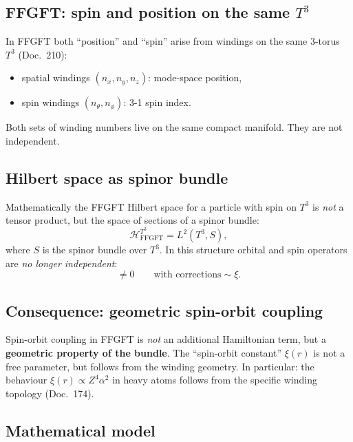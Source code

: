 \subsection{FFGFT: spin and position on the same $T^3$}

In FFGFT both \enquote{position} and \enquote{spin} arise from
windings on the same 3-torus $T^3$ (Doc.~210):
\begin{itemize}[leftmargin=2em,itemsep=2pt,topsep=2pt]
  \item spatial windings $(n_x, n_y, n_z)$: mode-space position,
  \item spin windings $(n_\theta, n_\phi)$: 3-1 spin index.
\end{itemize}
Both sets of winding numbers live on the same compact manifold.
They are not independent.

\subsection{Hilbert space as spinor bundle}

Mathematically the FFGFT Hilbert space for a particle with spin on
$T^3$ is \emph{not} a tensor product, but the space of sections of a
spinor bundle:
\begin{equation}
  \boxed{
    \mathcal{H}^{T^3}_{\text{FFGFT}}
    = L^2(T^3, S),
  }
\end{equation}
where $S$ is the spinor bundle over $T^3$. In this structure orbital
and spin operators are \emph{no longer independent}:
\begin{equation}
  [L_i, S_j] \neq 0
  \qquad \text{with corrections} \sim \xi.
\end{equation}

\subsection{Consequence: geometric spin-orbit coupling}

Spin-orbit coupling in FFGFT is \emph{not} an additional Hamiltonian
term, but a \textbf{geometric property of the bundle}. The
\enquote{spin-orbit constant} $\xi(r)$ is not a free parameter, but
follows from the winding geometry. In particular: the behaviour
$\xi(r) \propto Z^4 \alpha^2$ in heavy atoms follows from the
specific winding topology (Doc.~174).

\subsection{Mathematical model}

